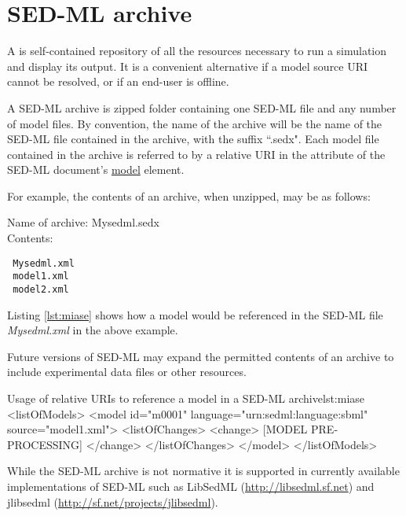 \chapter{SED-ML archive}
\label{app:archive} 
A  is self-contained repository of all the resources necessary to run a simulation and display its output. It is a convenient alternative if a model source URI cannot be resolved,  or if an end-user is offline. 

A SED-ML archive is zipped folder containing one SED-ML file and any number of model files. By convention,
 the name of the archive will be the name of the SED-ML file contained in the archive, with the suffix ``.sedx". Each model file contained in the archive is  referred to  by a relative URI  in the  attribute of the SED-ML document's  \hyperref[class:model]{model} element.
 
 For example, the contents of  an archive, when unzipped, may be as follows:
 
 Name of archive: Mysedml.sedx\\
 Contents: 
 \begin{verbatim}
 Mysedml.xml
 model1.xml
 model2.xml
 \end{verbatim}
 Listing \ref{lst:miase} shows how a model would be referenced in the SED-ML file \emph{Mysedml.xml} in the above example.
 
 Future versions of SED-ML may expand the permitted contents of an archive to include experimental data files or other resources.
%
\begin{myXmlLst}{Usage of relative URIs to reference a model in a SED-ML archive}{lst:miase}
<listOfModels>
 <model id="m0001" language="urn:sedml:language:sbml" 
  source="model1.xml">
  <listOfChanges>
   <change>
    [MODEL PRE-PROCESSING]
   </change>
   </listOfChanges> 
 </model>
</listOfModels>
\end{myXmlLst} 
%

While the SED-ML archive is not normative it is supported in currently available implementations of SED-ML such as LibSedML (\url{http://libsedml.sf.net})  and jlibsedml (\url{http://sf.net/projects/jlibsedml}).


